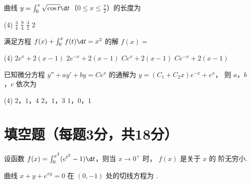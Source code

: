 \documentclass[quiet]{ctexart}
\begin{document}
\begin{problem}
  曲线 $y = \int_0^x \sqrt{\cos t} \d t$（$0 \leq x \leq \frac\pi2$）的长度为
  \begin{tasks}(4)
    \task $\frac34$
    \task $\frac94$
    \task $\frac32$
    \task $2$
  \end{tasks}
\end{problem}
\begin{solution}
  
\end{solution}

\begin{problem}
  满足方程 $f(x) + \int_0^x f(t) \d t = x^2$ 的解 $f(x) = $
  \begin{tasks}(4)
    \task $2e^x + 2(x - 1)$
    \task $2e^{-x} + 2(x - 1)$
    \task $Ce^{x} + 2(x - 1)$
    \task $Ce^{-x} + 2(x - 1)$
  \end{tasks}
\end{problem}
\begin{solution}
  
\end{solution}

\begin{problem}
  已知微分方程 $y'' + ay' + by = Ce^x$ 的通解为 $y = (C_1 + C_2x) e^{-x} + e^x$，
  则 $a$，$b$，$c$ 依次为
  \begin{tasks}(4)
    \task $2$，$1$，$4$
    \task $2$，$1$，$3$
    \task $1$，$0$，$1$
  \end{tasks}
\end{problem}
\begin{solution}
  
\end{solution}

\section{填空题（每题3分，共18分）}

\begin{problem}
  设函数 $f(x) = \int_0^{x^2} (e^{t^2} - 1) \d t$，则当 $x \to0^+$ 时，
  $f(x)$ 是关于 $x$ 的  阶无穷小.
\end{problem}
\begin{solution}
  
\end{solution}

\begin{problem}
  曲线 $x + y + e^{xy} = 0$ 在 $(0,-1)$ 处的切线方程为 .
\end{problem}
\begin{solution}
  
\end{solution}
\end{document}
